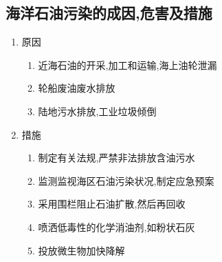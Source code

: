 \documentclass[a4paper]{article}
\begin{document}
    \subsection{海洋石油污染的成因,危害及措施}
    \begin{enumerate}
        \item 原因
        \begin{enumerate}
            \item 近海石油的开采,加工和运输,海上油轮泄漏 %
            \item 轮船废油废水排放
            \item 陆地污水排放,工业垃圾倾倒
        \end{enumerate}
        \item 措施
        \begin{enumerate}
            \item 制定有关法规,严禁非法排放含油污水
            \item 监测监视海区石油污染状况,制定应急预案
            \item 采用围栏阻止石油扩散,然后再回收
            \item 喷洒低毒性的化学消油剂,如粉状石灰
            \item 投放微生物加快降解
        \end{enumerate}
    \end{enumerate}
\end{document}
